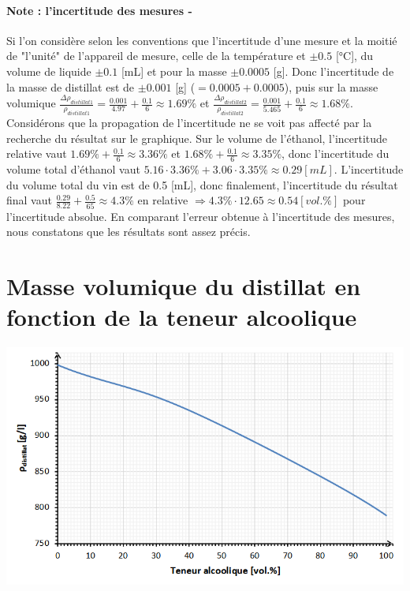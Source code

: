 \documentclass[11pt]{article}
\begin{document}
\paragraph*{Note : l'incertitude des mesures -}
Si l'on considère selon les conventions que l'incertitude d'une mesure et la moitié de "l'unité" de l'appareil de mesure, celle de la température et $\pm 0.5$ [°C], du volume de liquide $\pm 0.1$ [mL] et pour la masse $\pm 0.0005$ [g]. Donc l'incertitude de la masse de distillat est de $\pm 0.001$ [g] ($= 0.0005 + 0.0005$), puis sur la masse volumique $\frac{\Delta \rho _{distillat 1}}{\rho _{distillat 1}}  = \frac{0.001}{4.97} + \frac{0.1}{6} \approx 1.69 \%$ et $\frac{\Delta \rho _{distillat 2}}{\rho _{distillat 2}}  = \frac{0.001}{5.465} + \frac{0.1}{6} \approx 1.68 \%$. Considérons que la propagation de l'incertitude ne se voit pas affecté par la recherche du résultat sur le graphique. Sur le volume de l'éthanol, l'incertitude relative vaut $ 1.69 \% + \frac{0.1}{6} \approx 3.36 \%$ et $1.68 \% + \frac{0.1}{6} \approx 3.35 \%$, donc l'incertitude du volume total d'éthanol vaut $5.16 \cdot 3.36 \% + 3.06 \cdot 3.35 \% \approx 0.29 [mL]$. L'incertitude du volume total du vin est de 0.5 [mL], donc finalement, l'incertitude du résultat final vaut $\frac{0.29}{8.22} + \frac{0.5}{65} \approx 4.3 \%$ en relative $\Rightarrow 4.3 \% \cdot 12.65 \approx 0.54 [vol. \%]$ pour l'incertitude absolue. En comparant l'erreur obtenue à l'incertitude des mesures, nous constatons que les résultats sont assez précis.

\section*{Masse volumique du distillat en fonction de la teneur alcoolique}
\centering
\includegraphics[scale=0.7]{vin3.png}
\end{document}
